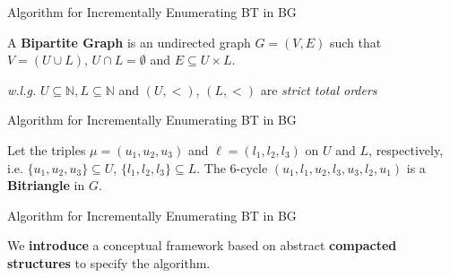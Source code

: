 \begin{frame}[fragile]{Algorithm for Incrementally Enumerating BT in BG}
  \begin{center}
  \large A \textbf{Bipartite Graph} is an undirected graph $G=(V,E)$  such that $V=(U\cup L)$, $U\cap L=\emptyset$ and $E\subseteq U\times L$.
  \end{center}     
  \begin{center}
    \small \emph{w.l.g.} $U \subseteq \mathbb{N}, L \subseteq \mathbb{N}$ and $(U, <)$, $(L, <)$ are \emph{strict total orders}
  \end{center}            
  \begin{figure}
    \centering
  \end{figure}
\end{frame}

\begin{frame}[fragile]{Algorithm for Incrementally Enumerating BT in BG}
  \begin{center}
  Let the triples $\mu=(u_1, u_2, u_3)$ and $\ell=(l_1, l_2,l_3)$ on $U$ and $L$, respectively, i.e.  $\{u_1, u_2, u_3\} \subseteq U$, $\{l_1, l_2,l_3\} \subseteq L$. 
  The 6-cycle $(u_1,l_1,u_2,l_3,u_3,l_2,u_1)$  is a \textbf{Bitriangle} in $G$. 
  \end{center}      
  \begin{figure}
    \centering
  \end{figure}
\end{frame}

\begin{frame}[fragile]{Algorithm for Incrementally Enumerating BT in BG}
  \begin{center}
    \large We \textbf{introduce} a conceptual framework based on abstract \textbf{compacted structures} to specify the algorithm.
  \end{center}    
  \begin{table}[H]
    \centering
   \end{table}
\end{frame}

